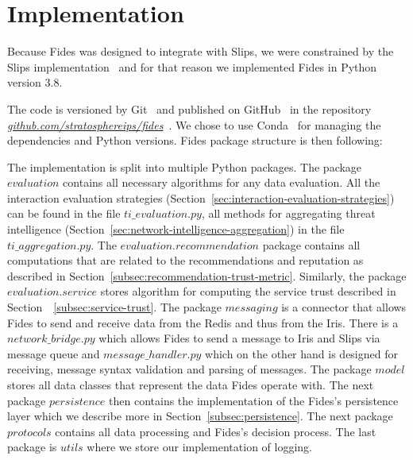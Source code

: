 \section{Implementation}
\label{sec:implementation}
Because Fides was designed to integrate with Slips, we were constrained by the Slips implementation~\cite{slips} and for that reason we implemented Fides in Python~\cite{python} version 3.8.

The code is versioned by Git~\cite{git} and published on GitHub~\cite{github} in the repository \textit{\href{https://github.com/stratosphereips/fides}{github.com/stratosphereips/fides}}~\cite{fidesGithub}.
We chose to use Conda~\cite{conda} for managing the dependencies and Python versions.
Fides package structure is then following:

\vspace{5mm}
\vspace{5mm}

The implementation is split into multiple Python packages. The package $evaluation$ contains all necessary algorithms for any data evaluation. All the interaction evaluation strategies (Section~\ref{sec:interaction-evaluation-strategies}) can be found in the file $ti\_evaluation.py$, all methods for aggregating threat intelligence  (Section~\ref{sec:network-intelligence-aggregation}) in the file $ti\_aggregation.py$.
The $evaluation.recommendation$ package contains all computations that are related to the recommendations and reputation as described in Section~\ref{subsec:recommendation-trust-metric}.
Similarly, the package $evaluation.service$ stores algorithm for computing the service trust described in Section~~\ref{subsec:service-trust}.
The package $messaging$ is a connector that allows Fides to send and receive data from the Redis and thus from the Iris.
There is a $network\_bridge.py$ which allows Fides to send a message to Iris and Slips via message queue and $message\_handler.py$ which on the other hand is designed for receiving, message syntax validation and parsing of messages.
The package $model$ stores all data classes that represent the data Fides operate with. 
The next package $persistence$ then contains the implementation of the Fides's persistence layer which we describe more in Section~\ref{subsec:persistence}.
The next package $protocols$ contains all data processing and Fides's decision process. 
The last package is $utils$ where we store our implementation of logging.

